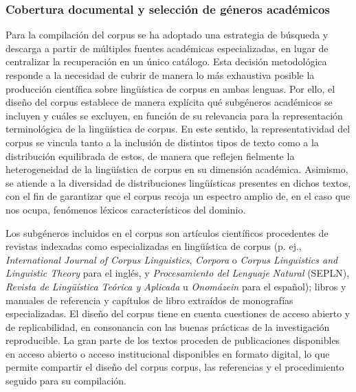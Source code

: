 \subsubsection{Cobertura documental y selección de géneros académicos}\label{subsec:genres}

Para la compilación del corpus se ha adoptado una estrategia de búsqueda y descarga a partir de múltiples fuentes académicas especializadas, en lugar de centralizar la recuperación en un único catálogo. Esta decisión metodológica responde a la necesidad de cubrir de manera lo más exhaustiva posible la producción científica sobre lingüística de corpus en ambas lenguas. Por ello, el diseño del corpus establece de manera explícita qué subgéneros académicos se incluyen y cuáles se excluyen, en función de su relevancia para la representación terminológica de la lingüística de corpus. En este sentido, la representatividad del corpus se vincula tanto a la inclusión de distintos tipos de texto como a la distribución equilibrada de estos, de manera que reflejen fielmente la heterogeneidad de la lingüística de corpus en su dimensión académica. Asimismo, se atiende a la diversidad de distribuciones lingüísticas presentes en dichos textos, con el fin de garantizar que el corpus recoja un espectro amplio de, en el caso que nos ocupa, fenómenos léxicos característicos del dominio.

Los subgéneros incluidos en el corpus son artículos científicos procedentes de revistas indexadas como especializadas en lingüística de corpus (p. ej., \textit{International Journal of Corpus Linguistics}, \textit{Corpora} o \textit{Corpus Linguistics and Linguistic Theory} para el inglés, y \textit{Procesamiento del Lenguaje Natural} (SEPLN), \textit{Revista de Lingüística Teórica y Aplicada} u \textit{Onomázein} para el español); libros y manuales de referencia y capítulos de libro extraídos de monografías especializadas. El diseño del corpus tiene en cuenta cuestiones de acceso abierto y de replicabilidad, en consonancia con las buenas prácticas de la investigación reproducible. La gran parte de los textos proceden de publicaciones disponibles en acceso abierto o acceso institucional disponibles en formato digital, lo que permite compartir el diseño del corpus corpus, las referencias y el procedimiento seguido para su compilación.

